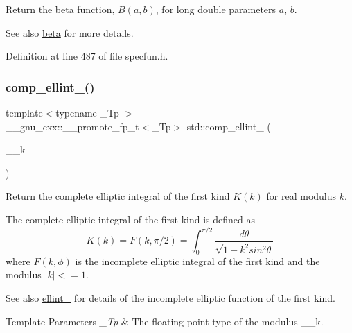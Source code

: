 Return the beta function, $B(a,b)$, for long double parameters $ a $, $ b $.

\begin{DoxySeeAlso}{See also}
\hyperlink{group__tr29124__math__spec__func_gaffed6cf5d5e3daf3e2c3a936bc0a33e7}{beta} for more details. 
\end{DoxySeeAlso}


Definition at line 487 of file specfun.\+h.

\mbox{\label{group__tr29124__math__spec__func_ga63f1e2ba4b94e170554d36882ee2be1d}} 
\subsubsection{\texorpdfstring{comp\+\_\+ellint\+\_()}{comp\_ellint\_1()}}
{\footnotesize\ttfamily template$<$typename \+\_\+\+Tp $>$ \\
\+\_\+\+\_\+gnu\+\_\+cxx\+::\+\_\+\+\_\+promote\+\_\+fp\+\_\+t$<$\+\_\+\+Tp$>$ std\+::comp\+\_\+ellint\+\_ (\begin{DoxyParamCaption}\item[{\+\_\+\+Tp}]{\+\_\+\+\_\+k }\end{DoxyParamCaption})\hspace{0.3cm}{\ttfamily [inline]}}

Return the complete elliptic integral of the first kind $ K(k) $ for real modulus $ k $.

The complete elliptic integral of the first kind is defined as \[ K(k) = F(k,\pi/2) = \int_0^{\pi/2}\frac{d\theta} {\sqrt{1 - k^2 sin^2\theta}} \] where $ F(k,\phi) $ is the incomplete elliptic integral of the first kind and the modulus $ |k| <= 1 $. \begin{DoxySeeAlso}{See also}
\hyperlink{group__tr29124__math__spec__func_ga8be90518215c6209679785e5444ee0af}{ellint\+\_} for details of the incomplete elliptic function of the first kind.
\end{DoxySeeAlso}

\begin{DoxyTemplParams}{Template Parameters}
{\em \+\_\+\+Tp} & The floating-\/point type of the modulus {\ttfamily \+\_\+\+\_\+k}. \\
\hline
\end{DoxyTemplParams}

